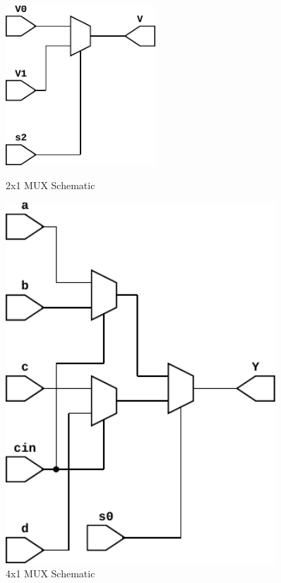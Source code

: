 \documentclass{article}
\begin{document}
\begin{figure}[H]
  \begin{minipage}{0.5\textwidth}
    \centering
    \includegraphics[width=0.5\textwidth]{figures/Mux_2x1.pdf}
    \caption{2x1 MUX Schematic}
  \end{minipage}%
  \begin{minipage}{0.5\textwidth}
    \centering
    \includegraphics[width=0.9\textwidth]{figures/Mux_4x1.pdf}
    \caption{4x1 MUX Schematic}
  \end{minipage}
\end{figure}
\end{document}
